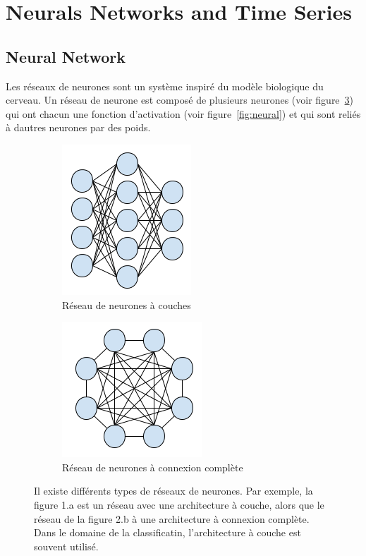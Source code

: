 \documentclass[11pt]{sdm}
\begin{document}
\section{Neurals Networks and Time Series}
	\subsection{Neural Network}
		Les r\'eseaux de neurones sont un syst\`eme inspir\'e du mod\`ele biologique du cerveau. Un r\'eseau de neurone est compos\'e de plusieurs neurones (voir figure~\ref{fig:neuralNetwork}) qui ont chacun une fonction d’activation (voir figure~\ref{fig:neural}) et qui sont reli\'es \`a d\textquotesingle autres neurones par des poids.

		\bigbreak

		\begin{figure}[!ht]
			\centering
			\begin{subfigure}{0.45\textwidth}
				\centering	
				\includegraphics[scale=0.7,natwidth=183,natheight=213]{figure2a.png}
				\caption{R\'eseau de neurones \`a couches}
				\label{fig:nnl}
			\end{subfigure}
			\hspace*{\fill}
			\begin{subfigure}{0.45\textwidth}	
				\centering
				\includegraphics[scale=0.7,natwidth=198,natheight=192]{figure2b.png}
				\caption{R\'eseau de neurones \`a connexion compl\`ete}
				\label{fig:nnc}
			\end{subfigure}
			\caption{Il existe diff\'erents types de r\'eseaux de neurones. Par exemple, la figure 1.a est un r\'eseau avec une architecture \`a couche, alors que le r\'eseau de la figure 2.b \`a une architecture \`a connexion compl\`ete. Dans le domaine de la classificatin, l'architecture \`a couche est souvent utilis\'e.}
			\label{fig:neuralNetwork}
		\end{figure}
\end{document}
